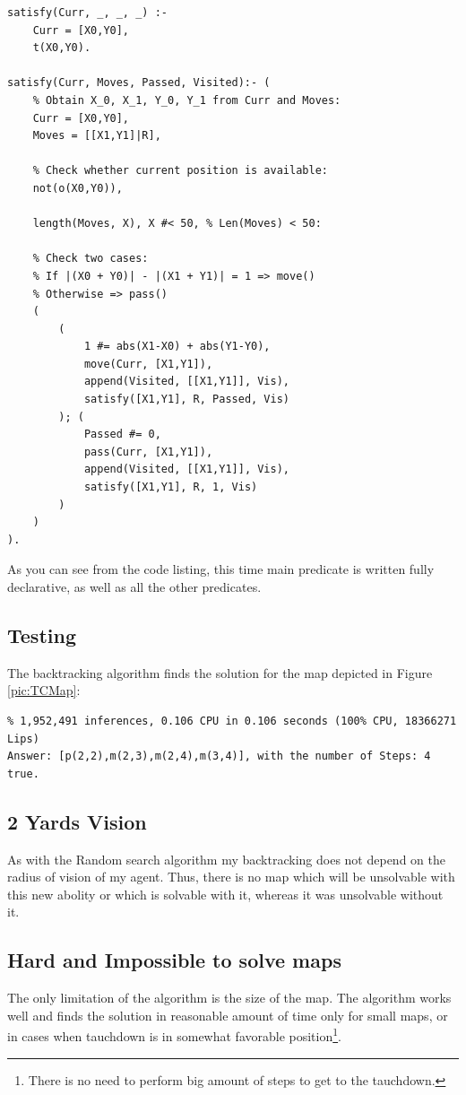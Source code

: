 \documentclass[a4apper,11pt]{article}
\begin{document}
\begin{lstlisting}[caption={Main Backtracking Predicate.}, label={backtracking:base}]
satisfy(Curr, _, _, _) :-
    Curr = [X0,Y0],
    t(X0,Y0).

satisfy(Curr, Moves, Passed, Visited):- (
	% Obtain X_0, X_1, Y_0, Y_1 from Curr and Moves:
    Curr = [X0,Y0],
    Moves = [[X1,Y1]|R],

    % Check whether current position is available:
    not(o(X0,Y0)),

    length(Moves, X), X #< 50, % Len(Moves) < 50:
    
    % Check two cases: 
    % If |(X0 + Y0)| - |(X1 + Y1)| = 1 => move()
    % Otherwise => pass()
    (
        (
            1 #= abs(X1-X0) + abs(Y1-Y0),
            move(Curr, [X1,Y1]),
            append(Visited, [[X1,Y1]], Vis),
            satisfy([X1,Y1], R, Passed, Vis)
        ); (
            Passed #= 0,
            pass(Curr, [X1,Y1]),
            append(Visited, [[X1,Y1]], Vis),
            satisfy([X1,Y1], R, 1, Vis)
        )
    )
).    
\end{lstlisting}

As you can see from the code listing, this time main predicate is written fully declarative, as well as all the other predicates.

\subsection{Testing}
The backtracking algorithm finds the solution for the map depicted in Figure \ref{pic:TCMap}:
\begin{lstlisting}
% 1,952,491 inferences, 0.106 CPU in 0.106 seconds (100% CPU, 18366271 Lips)
Answer: [p(2,2),m(2,3),m(2,4),m(3,4)], with the number of Steps: 4
true. 
\end{lstlisting}

\subsection{2 Yards Vision}
As with the Random search algorithm my backtracking does not depend on the radius of vision of my agent. Thus, there is no map which will be unsolvable with this new abolity or which is solvable with it, whereas it was unsolvable without it.

\subsection{Hard and Impossible to solve maps}
The only limitation of the algorithm is the size of the map. The algorithm works well and finds the solution in reasonable amount of time only for small maps, or in cases when tauchdown is in somewhat favorable position\footnote{There is no need to perform big amount of steps to get to the tauchdown.}.
\end{document}

